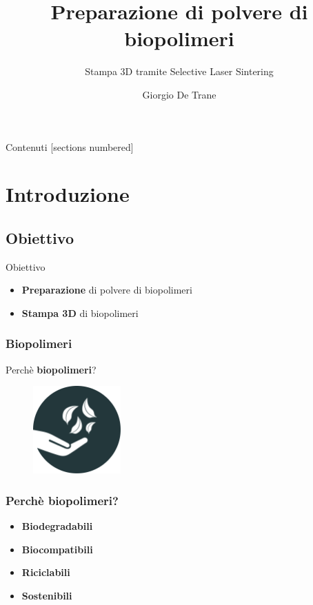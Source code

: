 \documentclass[10pt, aspectratio=169]{beamer}
\title{Preparazione di polvere di biopolimeri}
\subtitle{Stampa 3D tramite Selective Laser Sintering}
\date{}
\author{Giorgio De Trane}
\institute{Politecnico di Torino}
\begin{document}
\maketitle

\begin{frame}{Contenuti}
  [sections numbered]
  \tableofcontents[hideallsubsections]
\end{frame}


\section{Introduzione}
  \subsection{Obiettivo}

  \begin{frame}{Obiettivo}
    
    \begin{itemize}
      \item <1->\textbf{Preparazione} di polvere di biopolimeri
      \item <2>\textbf{Stampa 3D} di biopolimeri
    \end{itemize}
  \end{frame}

  \begin{frame}
    \frametitle{Biopolimeri}
    \begin{center}
        Perchè \textbf{biopolimeri}?
    \end{center}
    \begin{figure}[h]
      \centering
      \includegraphics[width=0.3\textwidth]{Pictures/Vector/PDF/hand_bio.pdf}
      
    \end{figure}

  \end{frame}

  \begin{frame}
    \frametitle{Perchè biopolimeri?}
    \begin{itemize}
      \item <1->\textbf{Biodegradabili}
      \item <2->\textbf{Biocompatibili}
      \item <3->\textbf{Riciclabili}
      \item <4> \textbf{Sostenibili}
    \end{itemize}


  \end{frame}
    
\end{document}
